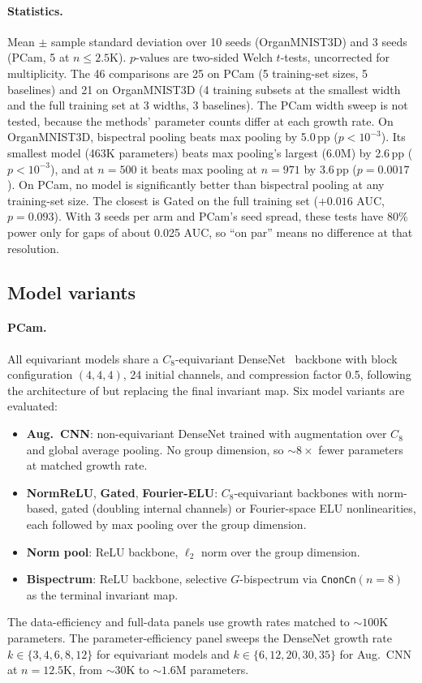 \documentclass{article}
\theoremstyle{definition}
\theoremstyle{remark}
\theoremstyle{definition}
\begin{document}
\paragraph{Statistics.}
Mean $\pm$ sample standard deviation over 10 seeds (OrganMNIST3D) and 3 seeds (PCam, 5 at
$n \le 2.5$K). $p$-values are two-sided Welch $t$-tests, uncorrected for multiplicity. The 46
comparisons are 25 on PCam (5 training-set sizes, 5 baselines) and 21 on OrganMNIST3D (4
training subsets at the smallest width and the full training set at 3 widths, 3 baselines).
The PCam width sweep is not tested, because the methods' parameter counts differ at each
growth rate. On
OrganMNIST3D, bispectral pooling beats max pooling by 5.0\,pp ($p < 10^{-3}$). Its smallest
model (463K parameters) beats max pooling's largest (6.0M) by 2.6\,pp
($p < 10^{-3}$), and at $n = 500$ it beats max pooling at $n = 971$ by
3.6\,pp ($p = 0.0017$). On PCam, no model is significantly better than bispectral
pooling at any training-set size. The closest is Gated on the full training set (${+}0.016$ AUC,
$p = 0.093$). With 3 seeds per arm and PCam's seed spread, these tests have 80\% power only for
gaps of about 0.025 AUC, so ``on par'' means no difference at that resolution.

\subsection{Model variants}

\paragraph{PCam.}
All equivariant models share a $C_8$-equivariant
DenseNet~\citep{huang2017densenet} backbone with block configuration
$(4, 4, 4)$, 24 initial channels, and compression factor 0.5,
following the architecture of \citet{veeling2018rotation} but
replacing the final invariant map. Six model variants are evaluated:
\begin{itemize}
  \item \textbf{Aug.\ CNN}: non-equivariant DenseNet trained with augmentation over $C_8$
    and global average pooling. No group dimension, so ${\sim}8\times$ fewer parameters at
    matched growth rate.
  \item \textbf{NormReLU}, \textbf{Gated}, \textbf{Fourier-ELU}: $C_8$-equivariant
    backbones with norm-based, gated (doubling internal channels) or Fourier-space ELU
    nonlinearities, each followed by max pooling over the group dimension.
  \item \textbf{Norm pool}: ReLU backbone, $\ell_2$ norm over the group dimension.
  \item \textbf{Bispectrum}: ReLU backbone, selective $G$-bispectrum via
    \texttt{CnonCn}$(n{=}8)$ as the terminal invariant map.
\end{itemize}
The data-efficiency and full-data panels use growth rates matched to ${\sim}100$K
parameters. The parameter-efficiency panel sweeps the DenseNet growth rate
$k \in \{3, 4, 6, 8, 12\}$ for equivariant models and $k \in \{6, 12, 20, 30, 35\}$ for
Aug.\ CNN at $n = 12.5$K, from ${\sim}30$K to ${\sim}1.6$M parameters.
\end{document}
